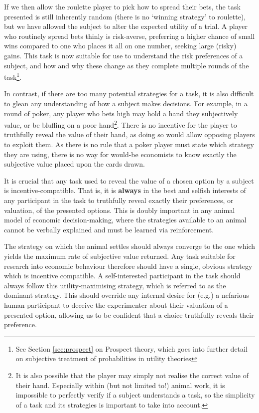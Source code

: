 If we then allow the roulette player to pick how to spread their bets, the task presented is still inherently random (there is no ‘winning strategy’ to roulette), but we have allowed the subject to alter the expected utility of a trial. A player who routinely spread bets thinly is risk-averse, preferring a higher chance of small wins compared to one who places it all on one number, seeking large (risky) gains. This task is now suitable for use to understand the risk preferences of a subject, and how and why these change as they complete multiple rounds of the task\footnote{See Section \ref{sec:prospect} on Prospect theory, which goes into further detail on subjective treatment of probabilities in utility theories}.

In contrast, if there are too many potential strategies for a task, it is also difficult to glean any understanding of how a subject makes decisions. For example, in a round of poker, any player who bets high may hold a hand they subjectively value, or be bluffing on a poor hand\footnote{It is also possible that the player may simply not realise the correct value of their hand. Especially within (but not limited to!) animal work, it is impossible to perfectly verify if a subject understands a task, so the simplicity of a task and its strategies is important to take into account.}. There is no incentive for the player to truthfully reveal the value of their hand, as doing so would allow opposing players to exploit them. As there is no rule that a poker player must state which strategy they are using, there is no way for would-be economists to know exactly the subjective value placed upon the cards drawn.

It is crucial that any task used to reveal the value of a chosen option by a subject is incentive-compatible. That is, it is \textbf{always} in the best and selfish interests of any participant in the task to truthfully reveal exactly their preferences, or valuation, of the presented options. This is doubly important in any animal model of economic decision-making, where the strategies available to an animal cannot be verbally explained and must be learned via reinforcement.

The strategy on which the animal settles should always converge to the one which yields the maximum rate of subjective value returned.
Any task suitable for research into economic behaviour therefore should have a single, obvious strategy which is incentive compatible. A self-interested participant in the task should always follow this utility-maximising strategy, which is referred to as the dominant strategy. This should override any internal desire for (e.g.) a nefarious human participant to deceive the experimenter about their valuation of a presented option, allowing us to be confident that a choice truthfully reveals their preference.

